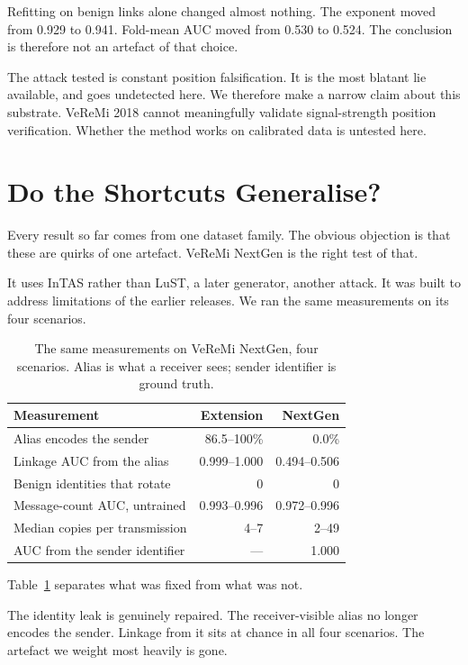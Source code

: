 \documentclass[journal,twoside]{IEEEtran}
\begin{document}
Refitting on benign links alone changed almost nothing.
The exponent moved from 0.929 to 0.941.
Fold-mean AUC moved from 0.530 to 0.524.
The conclusion is therefore not an artefact of that choice.

The attack tested is constant position falsification.
It is the most blatant lie available, and goes undetected here.
We therefore make a narrow claim about this substrate.
VeReMi 2018 cannot meaningfully validate signal-strength position verification.
Whether the method works on calibrated data is untested here.

\section{Do the Shortcuts Generalise?}
\label{sec:generalise}

Every result so far comes from one dataset family.
The obvious objection is that these are quirks of one artefact.
VeReMi NextGen is the right test of that.

It uses InTAS rather than LuST, a later generator, another attack.
It was built to address limitations of the earlier releases.
We ran the same measurements on its four scenarios.

\begin{table}[t]
\caption{The same measurements on VeReMi NextGen, four scenarios.
Alias is what a receiver sees; sender identifier is ground truth.}
\label{tab:nextgen}
\centering
\footnotesize
\begin{tabular}{@{}lrr@{}}
\toprule
Measurement & Extension & NextGen \\
\midrule
Alias encodes the sender & 86.5--100\% & 0.0\% \\
Linkage AUC from the alias & 0.999--1.000 & 0.494--0.506 \\
Benign identities that rotate & 0 & 0 \\
Message-count AUC, untrained & 0.993--0.996 & 0.972--0.996 \\
Median copies per transmission & 4--7 & 2--49 \\
AUC from the sender identifier & --- & 1.000 \\
\bottomrule
\end{tabular}
\end{table}

Table~\ref{tab:nextgen} separates what was fixed from what was not.

The identity leak is genuinely repaired.
The receiver-visible alias no longer encodes the sender.
Linkage from it sits at chance in all four scenarios.
The artefact we weight most heavily is gone.
\end{document}
